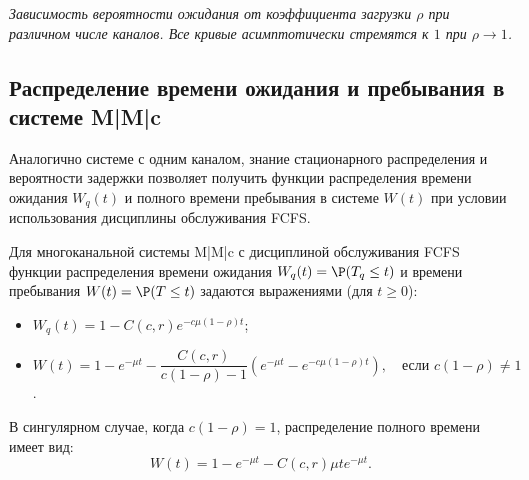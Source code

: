 \begin{center}
    
    \vspace{2mm}
    {\small \textit{Зависимость вероятности ожидания от коэффициента загрузки $\rho$ при различном числе каналов. Все кривые асимптотически стремятся к $1$ при $\rho \to 1$.}}
\end{center}

\subsection*{Распределение времени ожидания и пребывания в системе M|M|c}

Аналогично системе с одним каналом, знание стационарного распределения и вероятности задержки позволяет получить функции распределения времени ожидания $W_q(t)$ и полного времени пребывания в системе $W(t)$ при условии использования дисциплины обслуживания FCFS.

\begin{statement}
Для многоканальной системы M|M|c с дисциплиной обслуживания FCFS функции распределения времени ожидания $W_q(t) = \P(T_q \le t)$ и времени пребывания $W(t) = \P(T \le t)$ задаются выражениями (для $t \ge 0$):
\begin{itemize}
    \item $W_q(t) = 1 - C(c, r) e^{-c\mu(1-\rho)t}$;
    \item $W(t) = 1 - e^{-\mu t} - \dfrac{C(c, r)}{c(1-\rho) - 1} \left( e^{-\mu t} - e^{-c\mu(1-\rho)t} \right), \quad \text{если } c(1-\rho) \neq 1$.
\end{itemize}
В сингулярном случае, когда $c(1-\rho) = 1$, распределение полного времени имеет вид:
$$
W(t) = 1 - e^{-\mu t} - C(c, r) \mu t e^{-\mu t}.
$$
\end{statement}

